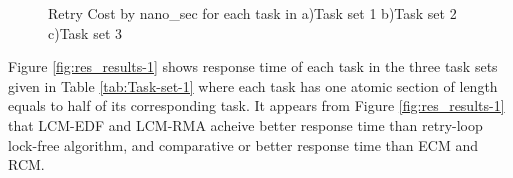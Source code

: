 \documentclass[conference]{sig-alternate}
\begin{document}
\begin{figure}[htbp]

\caption{\label{fig:RC_results}Retry Cost by nano\_sec for each task in a)Task
set 1 b)Task set 2 c)Task set 3}

\end{figure}

Figure \ref{fig:res_results-1} shows response time of each task in
the three task sets given in Table \ref{tab:Task-set-1} where each
task has one atomic section of length equals to half of its corresponding
task. It appears from Figure \ref{fig:res_results-1} that LCM-EDF
and LCM-RMA acheive better response time than retry-loop lock-free
algorithm, and comparative or better response time than ECM and RCM.
\end{document}
